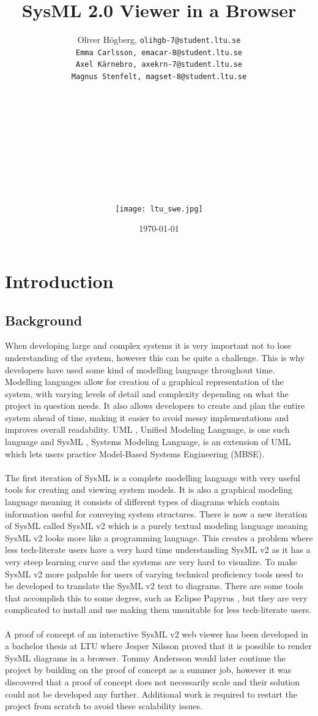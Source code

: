 \documentclass{article}
\title{SysML 2.0 Viewer in a Browser}
\author{Oliver Högberg, \tt olihgb-7@student.ltu.se \\ 
Emma Carlsson, \tt emacar-8@student.ltu.se \\ 
Axel Kärnebro, \tt axekrn-7@student.ltu.se \\ 
Magnus Stenfelt, \tt magset-8@student.ltu.se \\
\\
\\
\\
\\
\\
\\
\\
\\
\\
\\
\texttt{[image: ltu\_swe.jpg]}}
\date{\monthyeardate\today}
\begin{document}
\maketitle
\newpage
\tableofcontents
\newpage

\section{Introduction}

\subsection{Background}
When developing large and complex systems it is very important not to lose understanding of the system, however this can be quite a challenge. This is why developers have used some kind of modelling language throughout time. Modelling languages allow for creation of a graphical representation of the system, with varying levels of detail and complexity depending on what the project in question needs. It also allows developers to create and plan the entire system ahead of time, making it easier to avoid messy implementations and improves overall readability. UML \cite{UML}, Unified Modeling Language, is one such language and SysML \cite{SysML}, Systems Modeling Language, is an extension of UML which lets users practice Model-Based Systems Engineering \cite{MBSE} (MBSE).
\\ \\
The first iteration of SysML is a complete modelling language with very useful tools for creating and viewing system models. It is also a graphical modeling language meaning it consists of different types of diagrams which contain information useful for conveying system structures. There is now a new iteration of SysML called SysML v2 which is a purely textual modeling language meaning SysML v2 looks more like a programming language. This creates a problem where less tech-literate users have a very hard time understanding SysML v2 as it has a very steep learning curve and the systems are very hard to visualize. To make SysML v2 more palpable for users of varying technical proficiency tools need to be developed to translate the SysML v2 text to diagrams. There are some tools that accomplish this to some degree, such as Eclipse Papyrus \cite{EclipsePapyrus}, but they are very complicated to install and use making them unsuitable for less tech-literate users.
\\ \\
A proof of concept of an interactive SysML v2 web viewer has been developed in a bachelor thesis at LTU where Jesper Nilsson \cite{Jesper2020} proved that it is possible to render SysML diagrams in a browser. Tommy Andersson \cite{Tommy2020} would later continue the project by building on the proof of concept as a summer job, however it was discovered that a proof of concept does not necessarily scale and their solution could not be developed any further. Additional work is required to restart the project from scratch to avoid these scalability issues. 
\end{document}
